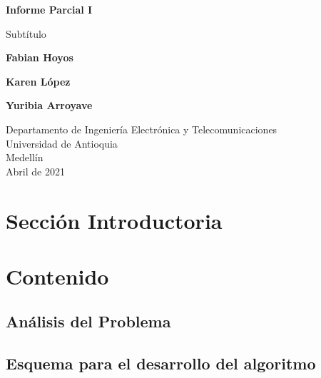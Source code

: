 \documentclass{article}
\begin{document}
\begin{titlepage}
    \begin{center}
        \vspace*{1cm}
            
        \Huge
        \textbf{Informe Parcial I}
            
        \vspace{0.5cm}
        \LARGE
        Subtítulo
            
        \vspace{1.5cm}
            
        \textbf{Fabian Hoyos}
        
        \vspace{1.5cm}
        
        \textbf{Karen López}
        
        \vspace{1.5cm}
        
        \textbf{Yuribia Arroyave}
            
        \vfill
            
        \vspace{0.8cm}
            
        \Large
        Departamento de Ingeniería Electrónica y Telecomunicaciones\\
        Universidad de Antioquia\\
        Medellín\\
       Abril de 2021
            
    \end{center}
\end{titlepage}

\tableofcontents
\newpage
\section{Sección Introductoria}\label{intro}

\section{Contenido} \label{contenido}

\subsection{Análisis del Problema}

\subsection{Esquema para el desarrollo del algoritmo}
\end{document}
